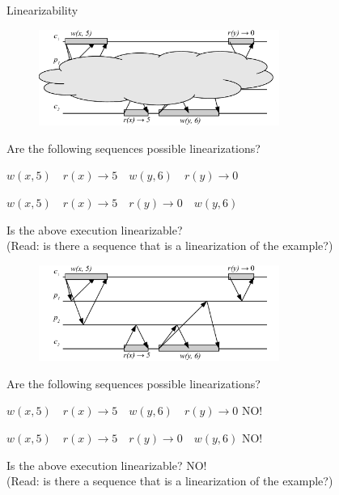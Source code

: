 \begin{frame}{Linearizability}

\begin{overprint}

\begin{figure}
\includegraphics[width=0.7\textwidth]{figs/09/lin-01}
\end{figure}

\begin{example}
\BI
\item Are the following sequences possible linearizations?
\BI
\item $w(x,5) \quad r(x) \rightarrow 5 \quad w(y,6) \quad r(y) \rightarrow 0$
\item $w(x,5) \quad r(x) \rightarrow 5 \quad r(y) \rightarrow 0 \quad w(y,6)$
\EI
\item Is the above execution linearizable?\\ (Read: is there a sequence that is a linearization of the example?)
\EI
\end{example}

\begin{figure}
\includegraphics[width=0.7\textwidth]{figs/09/lin-01n}
\end{figure}

\begin{example}
\BI
\item Are the following sequences possible linearizations?
\BI
\item $w(x,5) \quad r(x) \rightarrow 5 \quad w(y,6) \quad r(y) \rightarrow 0$    \qquad NO!
\item $w(x,5) \quad r(x) \rightarrow 5 \quad r(y) \rightarrow 0 \quad w(y,6)$    \qquad NO!
\EI
\item Is the above execution linearizable?    \qquad NO! \\ (Read: is there a sequence that is a linearization of the example?) 
\EI
\end{example}

\end{overprint}

\end{frame}


